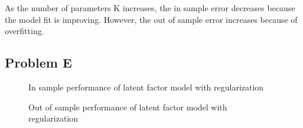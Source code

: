 \documentclass[12pt]{article} %
\begin{document}
As the number of parameters K increases, the in sample error decreases because the model fit is improving. However, the out of sample error increases because of overfitting.

\subsection{Problem E}

\begin{figure}[H]
	\vspace{-10mm}
	\caption{In sample performance of latent factor model with regularization}
\end{figure}

\begin{figure}[H]
	\vspace{-10mm}
	\caption{Out of sample performance of latent factor model with regularization}
\end{figure}
\end{document}
